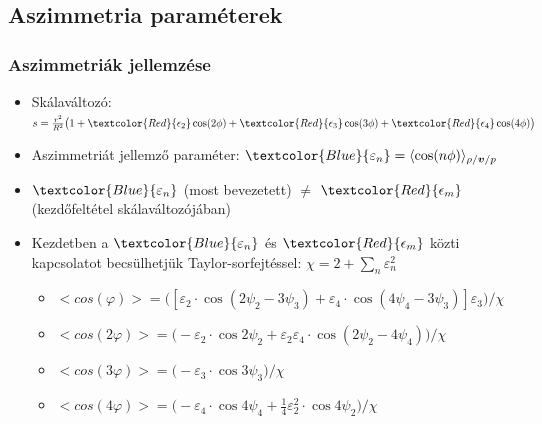 \documentclass{beamer}
\begin{document}
\subsection{Aszimmetria paraméterek}
\begin{frame}
\frametitle{Aszimmetriák jellemzése}
\begin{itemize}
  \setlength{\itemsep}{12pt}
\item<1-> Skálaváltozó: $s=\frac{r^2}{R^2}\big(1+\textcolor{Red}{\epsilon_2}\cos(2\phi)+\textcolor{Red}{\epsilon_3}\cos(3\phi)+\textcolor{Red}{\epsilon_4}\cos(4\phi)\big)$
\item<1-> Aszimmetriát jellemző paraméter: $\textcolor{Blue}{\varepsilon_n}=\langle \cos(n\phi)\rangle_{\rho/\bm{v}/p}$
\item<1-> $\textcolor{Blue}{\varepsilon_n}$ (most bevezetett)  $\neq$ $\textcolor{Red}{\epsilon_m}$  (kezdőfeltétel skálaváltozójában)
\item<1-> Kezdetben a $\textcolor{Blue}{\varepsilon_n}$ és $\textcolor{Red}{\epsilon_m}$ közti kapcsolatot becsülhetjük Taylor-sorfejtéssel: $\chi = 2+\sum_n \varepsilon_n^2$
\vspace{10pt}
\begin{itemize}
 \setlength{\itemsep}{8pt}
\item<1->$<cos(\varphi)> = \big([\varepsilon_2\cdot\cos{(2\psi_2-3\psi_3)}+\varepsilon_4\cdot\cos{(4\psi_4-3\psi_3)}]\varepsilon_3\big)/\chi$
\item<1->$<cos(2\varphi)> = \big(-\varepsilon_2\cdot\cos{2\psi_2} + \varepsilon_2\varepsilon_4\cdot\cos{(2\psi_2-4\psi_4)}\big)/\chi$
\item<1->$<cos(3\varphi)> = \big(-\varepsilon_3\cdot\cos{3\psi_3}\big)/\chi$
\item<1->$<cos(4\varphi)> = \big(-\varepsilon_4\cdot\cos{4\psi_4} + \frac{1}{4}\varepsilon_2^2\cdot\cos{4\psi_2}\big)/\chi$
\end{itemize}
\end{itemize}

\end{frame}
\end{document}
